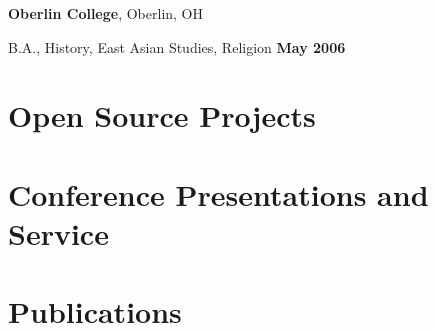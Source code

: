 \documentclass[margin,line]{res}
\newenvironment{list1}{
  \begin{list}{\ding{113}}{%
      \setlength{\itemsep}{0in}
      \setlength{\parsep}{0in} \setlength{\parskip}{0in}
      \setlength{\topsep}{0in} \setlength{\partopsep}{0in}
      \setlength{\leftmargin}{0.17in}}}{\end{list}}
\begin{document}
\begin{resume}
\textbf {Oberlin College}, Oberlin, OH\\
\vspace*{-.1in}
\begin{list1}
\item[] B.A., History, East Asian Studies, Religion \hfill \textbf{ May 2006}
\end{list1}

\section{\sc Open Source Projects}


\section{\sc Conference Presentations and Service}



\section{\sc Publications}




\end{resume}
\end{document}
